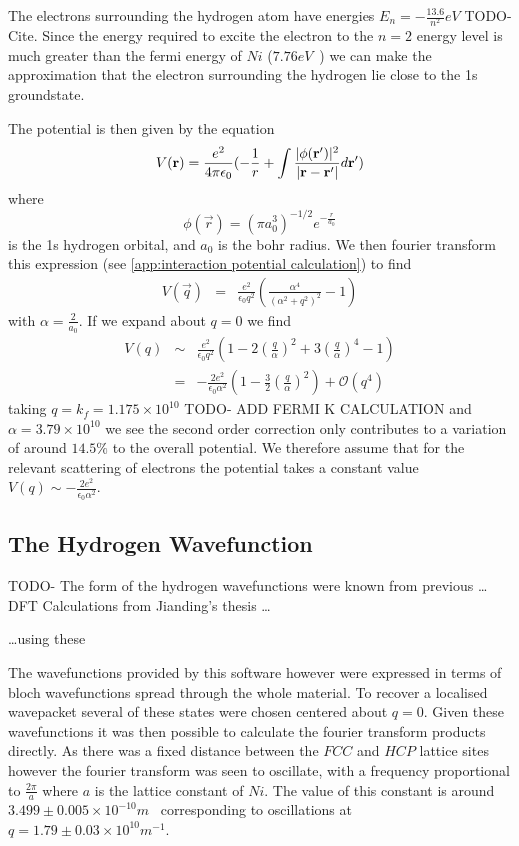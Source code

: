 The electrons surrounding the hydrogen
atom have energies \(E_n = -\frac{13.6}{n^2} eV\) TODO-Cite.
Since the energy required to excite the electron
to the \(n=2\) energy level is much greater
than the fermi energy of \(Ni\)
(\(7.76eV\)~\cite{PhysRev.131.2469}) we can
make the approximation that the electron surrounding
the hydrogen lie close to the 1s groundstate.

The potential is then given by the equation
\begin{equation}
    V(\mathbf{r}) = \frac{e^2}{4 \pi \epsilon_0}(
    -\frac{1}{r}
    + \int{\frac{\lvert\phi(\mathbf{r}')\rvert^2}{
            \lvert\mathbf{r} - \mathbf{r'}\rvert} d\mathbf{r}'})
\end{equation}
where
\begin{equation}
    \phi(\vec{r}) = {(\pi a_0^3)}^{-1/2} e^{-\frac{r}{a_0}}
\end{equation}
is the 1s hydrogen orbital, and \(a_0\) is
the bohr radius. We then fourier
transform this expression
(see \cref{app:interaction potential calculation})
to find
\begin{eqnarray}
    V(\vec{q}) &=& \frac{e^2}{\epsilon_0 q^2}(
    \frac{\alpha^4}{{(\alpha^2 + q^2)}^2} - 1
    )
\end{eqnarray}
with \(\alpha = \frac{2}{a_0}\). If we expand
about \(q=0\) we find
\begin{eqnarray}
    V(q) &\sim&\frac{e^2}{\epsilon_0 q^2}(1 - 2{(\frac{q}{\alpha})}^2 + 3 {(\frac{q}{\alpha})}^4 - 1)\\
    {} &=& -\frac{2e^2}{\epsilon_0 \alpha^2}(1 - \frac{3}{2}{(\frac{q}{\alpha})}^2) + \mathcal{O}(q^4)
\end{eqnarray}
taking \(q = k_f = 1.175\times{}10^{10}\) TODO- ADD FERMI K CALCULATION
and \(\alpha = 3.79\times{}10^{10}\) we see the second
order correction only contributes to a variation
of around \(14.5\% \) to the overall potential.
We therefore assume that for the relevant scattering
of electrons the potential takes a constant
value \(V(q) \sim -\frac{2e^2}{\epsilon_0 \alpha^2}\).

\subsection{The Hydrogen Wavefunction}
TODO-
The form of the hydrogen wavefunctions were
known from previous \ldots DFT Calculations from Jianding's thesis \ldots


\ldots using these

The wavefunctions provided by this software however
were expressed in terms of bloch wavefunctions spread
through the whole material. To recover a localised
wavepacket several of these states were chosen
centered about \(q=0\). Given these wavefunctions
it was then possible to calculate the fourier
transform products directly. As there was a fixed
distance between the \(FCC\) and \(HCP\) lattice
sites however the fourier transform was seen to
oscillate, with a frequency proportional to
\(\frac{2\pi}{a}\) where \(a\) is the lattice
constant of \(Ni\). The value of this constant
is around \(3.499\pm{}0.005\times{}10^{-10}m\)~\cite{PhysRev.25.753}
corresponding to oscillations at
\(q = 1.79 \pm 0.03 \times{}10^{10}m^{-1}\).

